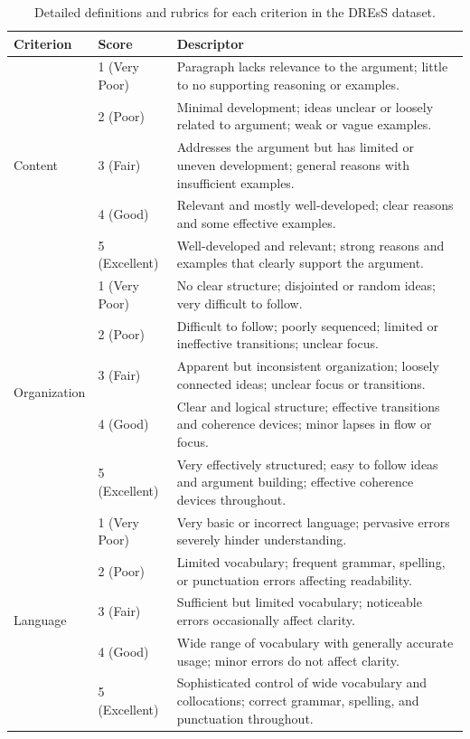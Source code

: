 \documentclass[11pt]{article}
\begin{document}
\begin{table}[h]
\centering
\renewcommand{\arraystretch}{1.4}
\begin{tabular}{|p{3.5cm}|p{2.4cm}|p{8.1cm}|}
\hline
\textbf{Criterion} & \textbf{Score} & \textbf{Descriptor} \\
\hline
\multirow{5}{=}{Content}
& 1 (Very Poor) & Paragraph lacks relevance to the argument; little to no supporting reasoning or examples. \\
& 2 (Poor) & Minimal development; ideas unclear or loosely related to argument; weak or vague examples. \\
& 3 (Fair) & Addresses the argument but has limited or uneven development; general reasons with insufficient examples. \\
& 4 (Good) & Relevant and mostly well-developed; clear reasons and some effective examples. \\
& 5 (Excellent) & Well-developed and relevant; strong reasons and examples that clearly support the argument. \\
\hline
\multirow{5}{=}{Organization}
& 1 (Very Poor) & No clear structure; disjointed or random ideas; very difficult to follow. \\
& 2 (Poor) & Difficult to follow; poorly sequenced; limited or ineffective transitions; unclear focus. \\
& 3 (Fair) & Apparent but inconsistent organization; loosely connected ideas; unclear focus or transitions. \\
& 4 (Good) & Clear and logical structure; effective transitions and coherence devices; minor lapses in flow or focus. \\
& 5 (Excellent) & Very effectively structured; easy to follow ideas and argument building; effective coherence devices throughout. \\
\hline
\multirow{5}{=}{Language}
& 1 (Very Poor) & Very basic or incorrect language; pervasive errors severely hinder understanding. \\
& 2 (Poor) & Limited vocabulary; frequent grammar, spelling, or punctuation errors affecting readability. \\
& 3 (Fair) & Sufficient but limited vocabulary; noticeable errors occasionally affect clarity. \\
& 4 (Good) & Wide range of vocabulary with generally accurate usage; minor errors do not affect clarity. \\
& 5 (Excellent) & Sophisticated control of wide vocabulary and collocations; correct grammar, spelling, and punctuation throughout. \\
\hline
\end{tabular}
\caption{Detailed definitions and rubrics for each criterion in the DREsS dataset.}
\label{apx:dress_rubric}
\end{table}
\end{document}
